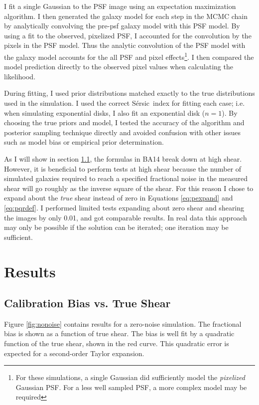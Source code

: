 \documentclass[12pt,preprint]{aastex}
\newcommand{\sersic}{S\'{e}rsic}
\begin{document}
I fit a single Gaussian to the PSF image using an expectation maximization
algorithm. I then generated the galaxy model for each step in the MCMC chain by
analytically convolving the pre-psf galaxy model with this PSF model.  By using
a fit to the observed, pixelized PSF, I accounted for the convolution by the
pixels in the PSF model.  Thus the analytic convolution of the PSF model with
the galaxy model accounts for the all PSF and pixel effects\footnote{For these
    simulations, a single Gaussian did sufficiently model the {\it pixelized}
Gaussian PSF. For a less well sampled PSF, a more complex model may be
required}.  I then compared the model prediction directly to the observed pixel
values when calculating the likelihood.


During fitting, I used prior distributions matched exactly to the true
distributions used in the simulation.  I used the correct \sersic\ index for
fitting each case; i.e. when simulating exponential disks, I also fit an
exponential disk ($n=1$).  By choosing the true priors and model, I tested the
accuracy of the algorithm and posterior sampling technique directly and avoided
confusion with other issues such as model bias or empirical prior
determination.

As I will show in section \ref{sec:truebias}, the formulas in BA14 break down
at high shear.  However, it is beneficial to perform tests at high shear
because the number of simulated galaxies required to reach a specified
fractional noise in the measured shear will go roughly as the inverse square of
the shear.  For this reason I chose to expand about the {\it true} shear
instead of zero in Equations \ref{eq:pexpand} and \ref{eq:pqrdef}.  I performed
limited tests expanding about zero shear and shearing the images by only 0.01,
and got comparable results. In real data this approach may only be possible if
the solution can be iterated; one iteration may be sufficient.

\section{Results} \label{sec:results}

\subsection{Calibration Bias vs. True Shear} \label{sec:truebias}

Figure \ref{fig:nonoise} contains results for a zero-noise simulation.  The
fractional bias is shown as a function of true shear.  The bias is well fit by
a quadratic function of the true shear, shown in the red curve. This quadratic
error is expected for a second-order Taylor expansion.
\end{document}

